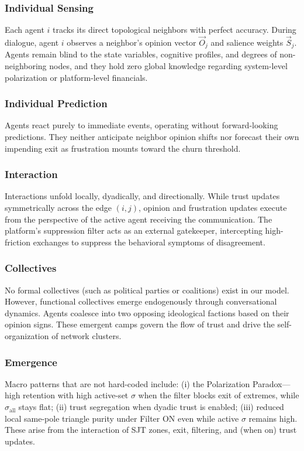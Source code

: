 \subsubsection{Individual Sensing}
Each agent $i$ tracks its direct topological neighbors with perfect accuracy. During dialogue, agent $i$ observes a neighbor's opinion vector $\vec{O}_j$ and salience weights $\vec{S}_j$. Agents remain blind to the state variables, cognitive profiles, and degrees of non-neighboring nodes, and they hold zero global knowledge regarding system-level polarization or platform-level financials.

\subsubsection{Individual Prediction}
Agents react purely to immediate events, operating without forward-looking predictions. They neither anticipate neighbor opinion shifts nor forecast their own impending exit as frustration mounts toward the churn threshold.

\subsubsection{Interaction}
Interactions unfold locally, dyadically, and directionally. While trust updates symmetrically across the edge $(i, j)$, opinion and frustration updates execute from the perspective of the active agent receiving the communication. The platform's suppression filter acts as an external gatekeeper, intercepting high-friction exchanges to suppress the behavioral symptoms of disagreement.

\subsubsection{Collectives}
No formal collectives (such as political parties or coalitions) exist in our model. However, functional collectives emerge endogenously through conversational dynamics. Agents coalesce into two opposing ideological factions based on their opinion signs. These emergent camps govern the flow of trust and drive the self-organization of network clusters.

\subsubsection{Emergence}
Macro patterns that are not hard-coded include: (i) the Polarization Paradox---high retention with high active-set $\sigma$ when the filter blocks exit of extremes, while $\sigma_{\mathrm{all}}$ stays flat; (ii) trust segregation when dyadic trust is enabled; (iii) reduced local same-pole triangle purity under Filter ON even while active $\sigma$ remains high. These arise from the interaction of SJT zones, exit, filtering, and (when on) trust updates.

